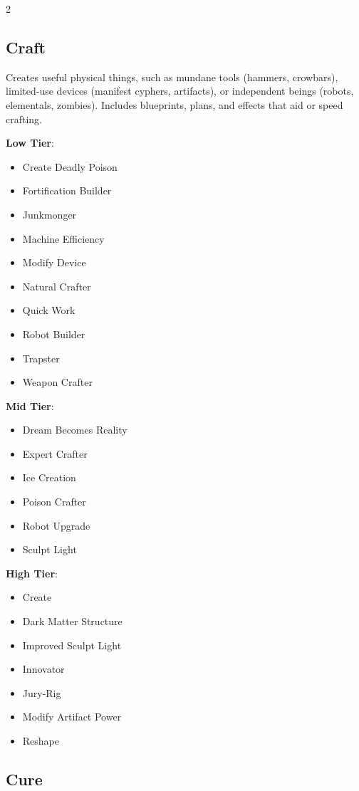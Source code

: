\begin{multicols}{2}
\subsection{Craft}

Creates useful physical things, such as mundane tools (hammers, crowbars), limited-use devices (manifest cyphers, artifacts), or independent beings (robots, elementals, zombies). Includes blueprints, plans, and effects that aid or speed crafting.

\textbf{Low Tier}:

\begin{itemize}
\item Create Deadly Poison
\item Fortification Builder
\item Junkmonger
\item Machine Efficiency
\item Modify Device
\item Natural Crafter
\item Quick Work
\item Robot Builder
\item Trapster
\item Weapon Crafter
\end{itemize}

\textbf{Mid Tier}:

\begin{itemize}
\item Dream Becomes Reality
\item Expert Crafter
\item Ice Creation
\item Poison Crafter
\item Robot Upgrade
\item Sculpt Light
\end{itemize}

\textbf{High Tier}:

\begin{itemize}
\item Create
\item Dark Matter Structure
\item Improved Sculpt Light
\item Innovator
\item Jury-Rig
\item Modify Artifact Power
\item Reshape
\end{itemize}

\subsection{Cure}


\end{multicols}
